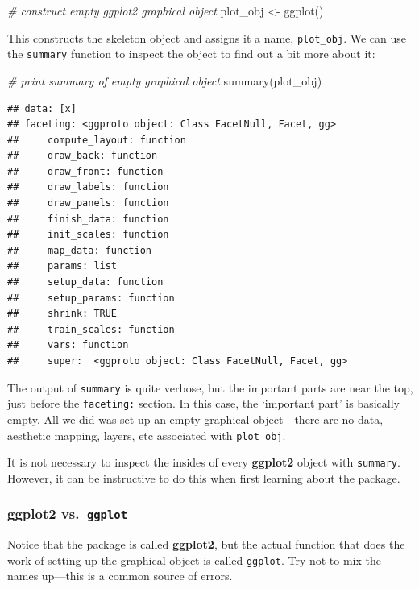 \documentclass[
]{book}
\newenvironment{Shaded}{\begin{snugshade}}{\end{snugshade}}
\newcommand{\CommentTok}[1]{\textcolor[rgb]{0.56,0.35,0.01}{\textit{#1}}}
\newcommand{\FunctionTok}[1]{\textcolor[rgb]{0.00,0.00,0.00}{#1}}
\newcommand{\NormalTok}[1]{#1}
\newcommand{\OtherTok}[1]{\textcolor[rgb]{0.56,0.35,0.01}{#1}}
\newenvironment{greybox}{
  \definecolor{shadecolor}{rgb}{0.95,0.95,0.95}  %
  \color{black}
  \begin{shaded}}
 {\end{shaded}}
\newenvironment{infobox}[1]
  {
  \begin{itemize}
  \renewcommand{\labelitemi}{
    \raisebox{-.7\height}[0pt][0pt]{
      {\setkeys{Gin}{width=3em,keepaspectratio}
        \texttt{[image: images/\#1]}}
    }
  }
  \setlength{\fboxsep}{1em}
  \begin{greybox}
  \item
  }
  {
  \end{greybox}
  \end{itemize}
  }
\begin{document}
\begin{Shaded}
\begin{Highlighting}[]
\CommentTok{\# construct empty ggplot2 graphical object}
\NormalTok{plot\_obj }\OtherTok{\textless{}{-}} \FunctionTok{ggplot}\NormalTok{()}
\end{Highlighting}
\end{Shaded}

This constructs the skeleton object and assigns it a name, \texttt{plot\_obj}. We can use the \texttt{summary} function to inspect the object to find out a bit more about it:

\begin{Shaded}
\begin{Highlighting}[]
\CommentTok{\# print summary of empty graphical object}
\FunctionTok{summary}\NormalTok{(plot\_obj)}
\end{Highlighting}
\end{Shaded}

\begin{verbatim}
## data: [x]
## faceting: <ggproto object: Class FacetNull, Facet, gg>
##     compute_layout: function
##     draw_back: function
##     draw_front: function
##     draw_labels: function
##     draw_panels: function
##     finish_data: function
##     init_scales: function
##     map_data: function
##     params: list
##     setup_data: function
##     setup_params: function
##     shrink: TRUE
##     train_scales: function
##     vars: function
##     super:  <ggproto object: Class FacetNull, Facet, gg>
\end{verbatim}

The output of \texttt{summary} is quite verbose, but the important parts are near the top, just before the \texttt{faceting:} section. In this case, the `important part' is basically empty. All we did was set up an empty graphical object---there are no data, aesthetic mapping, layers, etc associated with \texttt{plot\_obj}.

It is not necessary to inspect the insides of every \textbf{ggplot2} object with \texttt{summary}. However, it can be instructive to do this when first learning about the package.

\begin{infobox}{information}

\hypertarget{ggplot2-vs.-ggplot}{%
\subsubsection*{\texorpdfstring{\textbf{ggplot2} vs.~\texttt{ggplot}}{ggplot2 vs.~ggplot}}\label{ggplot2-vs.-ggplot}}

Notice that the package is called \textbf{ggplot2}, but the actual function that does the work of setting up the graphical object is called \texttt{ggplot}. Try not to mix the names up---this is a common source of errors.

\end{infobox}
\end{document}
